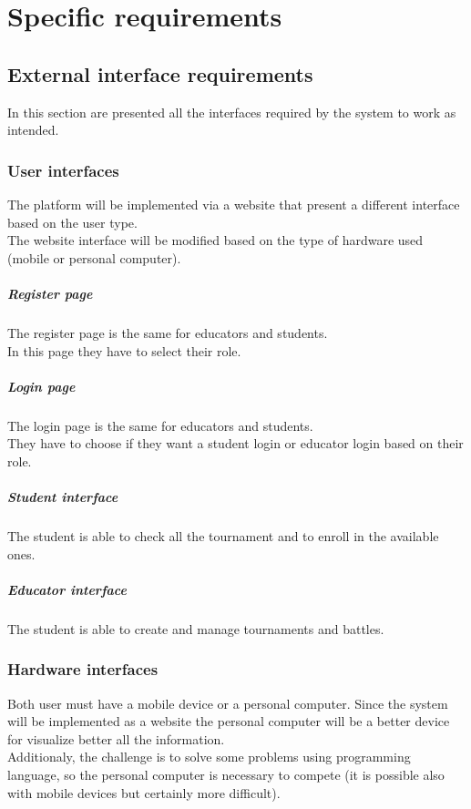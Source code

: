 \documentclass[12pt, a4paper]{report}
\begin{document}
\chapter{Specific requirements}
    \section{External interface requirements}
        In this section are presented all the interfaces required by the system to work as intended. 

        \subsection{User interfaces}
        The platform will be implemented via a website that present a different interface based on the user type. \\
        The website interface will be modified based on the type of hardware used (mobile or personal computer). 

        \paragraph*{Register page} 
        The register page is the same for educators and students. \\
        In this page they have to select their role. 

        \paragraph*{Login page} 
        The login page is the same for educators and students. \\
        They have to choose if they want a student login or educator login based on their role. 

        \paragraph*{Student interface} 
        The student is able to check all the tournament and to enroll in the available ones. 

        \paragraph*{Educator interface} 
        The student is able to create and manage tournaments and battles. 


        \subsection{Hardware interfaces}
        Both user must have a mobile device or a personal computer. 
        Since the system will be implemented as a website the personal computer will be a better device for visualize better all the information. \\
        Additionaly, the challenge is to solve some problems using programming language, so the personal computer is necessary to compete (it is possible also with mobile devices but certainly more difficult). 
\end{document}
